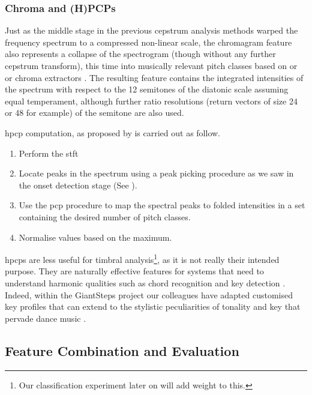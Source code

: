 {{{{\subsubsection{Chroma and (H)PCPs}

Just as the middle stage in the previous cepstrum analysis methods warped the frequency spectrum to a compressed non-linear scale, the chromagram feature also represents a collapse of the spectrogram (though without any further cepstrum transform), this time into musically relevant pitch classes based on  \citep{Fujishima1999} or  \citep{Gomez2004} or chroma extractors \citep{Orio2006}. The resulting feature contains the integrated intensities of the spectrum with respect to the 12 semitones of the diatonic scale assuming equal temperament, although further ratio resolutions (return vectors of size 24 or 48 for example) of the semitone are also used.

\acrshort{hpcp} computation, as proposed by \cite{Gomez2006} is carried out as follow. 

\begin{enumerate}
  \item Perform the \acrshort{stft}
  \item Locate peaks in the spectrum using a peak picking procedure as we saw in the onset detection stage (See ).
  \item Use the \acrshort{pcp} procedure to map the spectral peaks to folded intensities in a set containing the desired number of pitch classes.
  \item Normalise values based on the maximum.
\end{enumerate}

\acrshort{hpcp}s are less useful for timbral analysis\footnote{Our classification experiment later on will add weight to this.}, as it is not really their intended purpose. They are naturally effective features for systems that need to understand harmonic qualities such as chord recognition \citep{Fujishima1999} and key detection \citep{Gomez2004}. Indeed, within the GiantSteps project our colleagues have adapted customised key profiles that can extend to the stylistic peculiarities of tonality and key that pervade dance music \citep{Faraldo2016, Faraldo2017, Faraldo2017b}.

\subsection{Feature Combination and Evaluation}

}}}}
